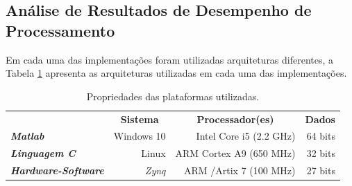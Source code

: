  
\subsection{Análise de Resultados de Desempenho de Processamento}

Em cada uma das implementações foram utilizadas arquiteturas diferentes, a Tabela \ref{propriedades} apresenta as arquiteturas utilizadas em cada uma das implementações.  

\begin{table}[!h]
	\centering
	\caption{Propriedades das plataformas utilizadas.}
	\label{propriedades}
	\begin{tabular}{lrrr}
		\rowcolor[HTML]{DAE8FC} 
		\multicolumn{1}{c}{\cellcolor[HTML]{DAE8FC}\textbf{Implementação}} & \multicolumn{1}{c}{\cellcolor[HTML]{DAE8FC}\textbf{Sistema}} & \multicolumn{1}{c}{\cellcolor[HTML]{DAE8FC}\textbf{Processador(es)}} & \multicolumn{1}{c}{\cellcolor[HTML]{DAE8FC}\textbf{Dados}} \\
		\textit{\textbf{Matlab}}                                        & Windows 10                                                   & Intel Core i5 (2.2 GHz)                                              & 64 bits                                                    \\
		\rowcolor[HTML]{DAE8FC} 
		\textit{\textbf{Linguagem C}}                                   & Linux                                                        & ARM Cortex A9 (650 MHz)                                              & 32 bits                                                    \\
		\textit{\textbf{Hardware-Software}}                             & \textit{Zynq}                                                & ARM /Artix 7 (100 MHz)                                               & 27 bits                                                   
	\end{tabular}
\end{table}


